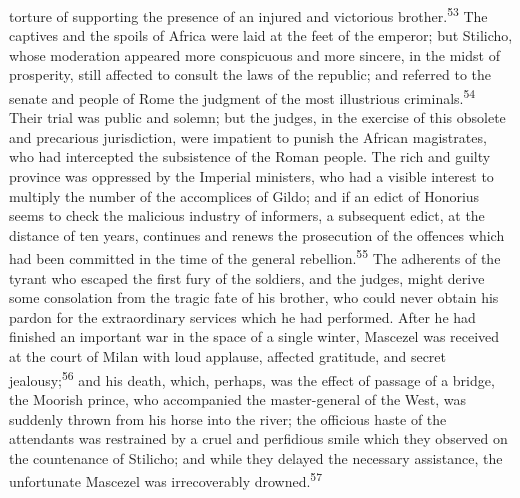 torture of supporting the presence of an injured and victorious
brother.\textsuperscript{53} The captives and the spoils of Africa were laid at
the feet of the emperor; but Stilicho, whose moderation appeared
more conspicuous and more sincere, in the midst of prosperity,
still affected to consult the laws of the republic; and referred
to the senate and people of Rome the judgment of the most
illustrious criminals.\textsuperscript{54} Their trial was public and solemn; but
the judges, in the exercise of this obsolete and precarious
jurisdiction, were impatient to punish the African magistrates,
who had intercepted the subsistence of the Roman people. The rich
and guilty province was oppressed by the Imperial ministers, who
had a visible interest to multiply the number of the accomplices
of Gildo; and if an edict of Honorius seems to check the
malicious industry of informers, a subsequent edict, at the
distance of ten years, continues and renews the prosecution of
the offences which had been committed in the time of the general
rebellion.\textsuperscript{55} The adherents of the tyrant who escaped the first
fury of the soldiers, and the judges, might derive some
consolation from the tragic fate of his brother, who could never
obtain his pardon for the extraordinary services which he had
performed. After he had finished an important war in the space of
a single winter, Mascezel was received at the court of Milan with
loud applause, affected gratitude, and secret jealousy;\textsuperscript{56} and
his death, which, perhaps, was the effect of passage of a bridge,
the Moorish prince, who accompanied the master-general of the
West, was suddenly thrown from his horse into the river; the
officious haste of the attendants was restrained by a cruel and
perfidious smile which they observed on the countenance of
Stilicho; and while they delayed the necessary assistance, the
unfortunate Mascezel was irrecoverably drowned.\textsuperscript{57}




